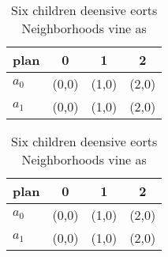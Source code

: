 \documentclass[a4paper]{article}
\begin{document}
\begin{table}
\begin{adjustbox}{width=0.6\columnwidth}
\begin{tabular}{|l|l|l|l|}
\hline
\textbf{plan} & \multicolumn{1}{c|}{\textbf{0}} & \multicolumn{1}{c|}{\textbf{1}} & \multicolumn{1}{c|}{\textbf{2}} \\ \hline
\textbf{$a_0$}  & (0,0) & (1,0) & (2,0) \\ \hline
\textbf{$a_1$}  & (0,0) & (1,0) & (2,0) \\ \hline
\end{tabular}
\end{adjustbox}
\caption{Six children deensive eorts Neighborhoods vine as
}
\end{table}

\begin{table}
\begin{adjustbox}{width=0.6\columnwidth}
\begin{tabular}{|l|l|l|l|}
\hline
\textbf{plan} & \multicolumn{1}{c|}{\textbf{0}} & \multicolumn{1}{c|}{\textbf{1}} & \multicolumn{1}{c|}{\textbf{2}} \\ \hline
\textbf{$a_0$}  & (0,0) & (1,0) & (2,0) \\ \hline
\textbf{$a_1$}  & (0,0) & (1,0) & (2,0) \\ \hline
\end{tabular}
\end{adjustbox}
\caption{Six children deensive eorts Neighborhoods vine as
}
\end{table}
\end{document}
